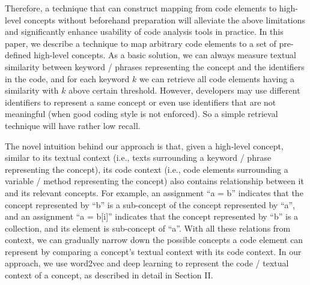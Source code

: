Therefore, a technique that can construct mapping from code elements to high-level concepts without beforehand preparation will alleviate the above limitations and significantly enhance usability of code analysis tools in practice. In this paper, we describe a technique to map arbitrary code elements to a set of pre-defined high-level concepts. As a basic solution, we can always measure textual similarity between keyword / phrases representing the concept and the identifiers in the code, and for each keyword $k$ we can retrieve all code elements having a similarity with $k$ above certain threshold. However, developers may use different identifiers to represent a same concept or even use identifiers that are not meaningful (when good coding style is not enforced). So a simple retrieval technique will have rather low recall. 

The novel intuition behind our approach is that, given a high-level concept, similar to its textual context (i.e., texts surrounding a keyword / phrase representing the concept), its code context (i.e., code elements surrounding a variable / method representing the concept) also contains relationship between it and its relevant concepts. For example, an assignment ``a = b'' indicates that the concept represented by ``b'' is a sub-concept of the concept represented by ``a'', and an assignment ``a = b[i]'' indicates that the concept represented by ``b'' is a collection, and its element is sub-concept of ``a''. With all these relations from context, we can gradually narrow down the possible concepts a code element can represent by comparing a concept's textual context with its code context. In our approach, we use word2vec and deep learning to represent the code / textual context of a concept, as described in detail in Section II. 









